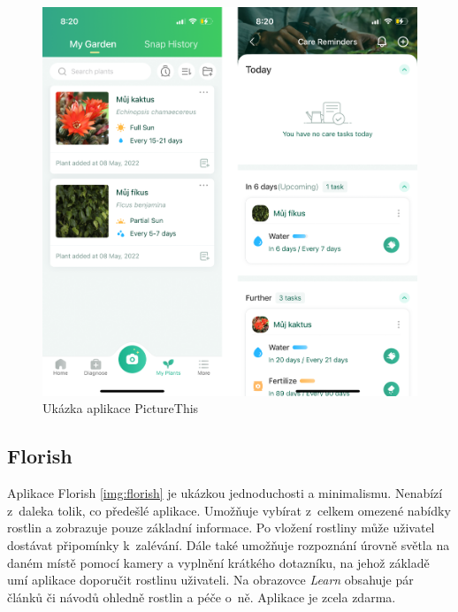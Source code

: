 \documentclass[thesis=M,czech]{FITthesis}[2019/12/23]
\begin{document}
    \begin{figure}
    	\centering
    	\includegraphics[width=0.75\linewidth]{images/picturethis.png}
      	\caption{Ukázka aplikace PictureThis}
      	\label{img:picturethis}
    \end{figure}
    
\subsection{Florish}
    Aplikace Florish \ref{img:florish} je ukázkou jednoduchosti a minimalismu. Nenabízí z~daleka tolik, co předešlé aplikace. Umožňuje vybírat z~celkem omezené nabídky rostlin a zobrazuje pouze základní informace. Po vložení rostliny může uživatel dostávat připomínky k~zalévání. Dále také umožňuje rozpoznání úrovně světla na daném místě pomocí kamery a vyplnění krátkého dotazníku, na jehož základě umí aplikace doporučit rostlinu uživateli. Na obrazovce \textit{Learn} obsahuje pár článků či návodů ohledně rostlin a péče o~ně. Aplikace je zcela zdarma.
    
\end{document}
